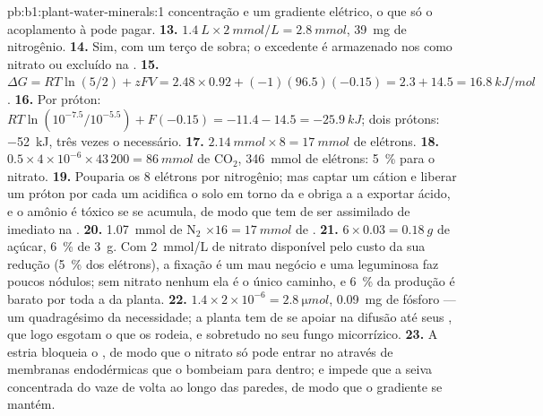\begin{solution}{pb:b1:plant-water-minerals:1}
concentração e um gradiente elétrico, o que só o acoplamento à  pode pagar.
\textbf{13.} $\qty{1.4}{L}\times\qty{2}{mmol/L} = \qty{2.8}{mmol}$,
\qty{39}{mg} de nitrogênio.
\textbf{14.} Sim, com um terço de sobra; o excedente é armazenado nos
 como nitrato ou excluído na .
\textbf{15.} $\Delta G = RT\ln(5/2) + zFV = 2.48\times 0.92 + (-1)(96.5)(-0.15)
= 2.3 + 14.5 = \qty{16.8}{kJ/mol}$.
\textbf{16.} Por próton: $RT\ln(10^{-7.5}/10^{-5.5}) + F(-0.15) =
-11.4 - 14.5 = \qty{-25.9}{kJ}$; dois prótons: \qty{-52}{kJ}, três
vezes o necessário.
\textbf{17.} $\qty{2.14}{mmol}\times 8 = \qty{17}{mmol}$ de elétrons.
\textbf{18.} $0.5\times 4\times 10^{-6}\times 43\,200 = \qty{86}{mmol}$
de $\mathrm{CO_2}$, \qty{346}{mmol} de elétrons: \qty{5}{\%} para o
nitrato.
\textbf{19.} Pouparia os 8 elétrons por nitrogênio; mas captar um
cátion e liberar um próton por cada um acidifica o solo em torno da
 e obriga a  a exportar ácido, e o amônio é tóxico se se
acumula, de modo que tem de ser assimilado de imediato na .
\textbf{20.} \qty{1.07}{mmol} de $\mathrm{N_2}$ $\times 16 =
\qty{17}{mmol}$ de .
\textbf{21.} $6\times 0.03 = \qty{0.18}{g}$ de açúcar, \qty{6}{\%} de
\qty{3}{g}. Com \qty{2}{mmol/L} de nitrato disponível pelo custo da
sua redução (\qty{5}{\%} dos elétrons), a fixação é um mau negócio e
uma leguminosa faz poucos nódulos; sem nitrato nenhum ela é o único
caminho, e \qty{6}{\%} da produção é barato por toda a  da
planta.
\textbf{22.} $1.4\times 2\times 10^{-6} = \qty{2.8}{\micro mol}$,
\qty{0.09}{mg} de fósforo --- um quadragésimo da necessidade; a planta
tem de se apoiar na difusão até seus , que logo
esgotam o que os rodeia, e sobretudo no seu fungo micorrízico.
\textbf{23.} A estria bloqueia o , de modo que o nitrato só
pode entrar no  através de membranas endodérmicas que o bombeiam
para dentro; e impede que a seiva concentrada do  vaze de volta
ao longo das paredes, de modo que o gradiente se mantém.

\end{solution}
